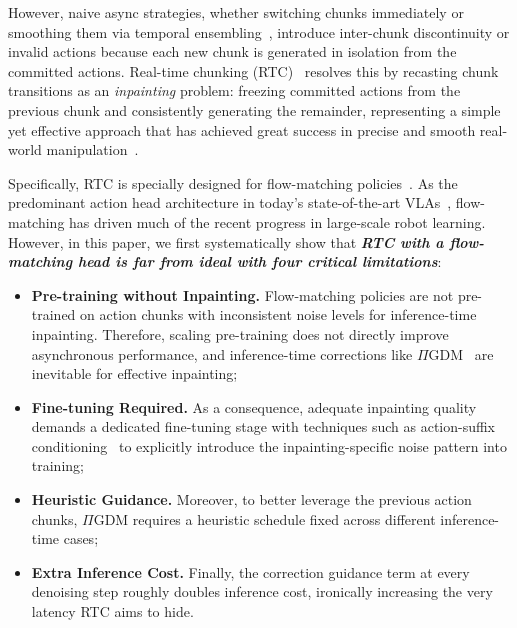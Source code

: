 \documentclass{article}
\begin{document}
However, naive async strategies, whether switching chunks immediately or smoothing them via temporal ensembling~\citep{zhao2023learning}, introduce inter-chunk discontinuity or invalid actions because each new chunk is generated in isolation from the committed actions.
Real-time chunking (RTC)~\citep{black2025real} resolves this by recasting chunk transitions as an \emph{inpainting} problem: freezing committed actions from the previous chunk and consistently generating the remainder, representing a simple yet effective approach that has achieved great success in precise and smooth real-world manipulation~\citep{intelligence2025pi_06, intelligence2026pi}.

Specifically, RTC is specially designed for flow-matching policies~\citep{lipman2022flow}.
As the predominant action head architecture in today's state-of-the-art VLAs~\citep{black2024pi_0, intelligence2025pi_, bjorck2025gr00t}, flow-matching has driven much of the recent progress in large-scale robot learning.
However, in this paper, we first systematically show that \emph{\textbf{RTC with a flow-matching head is far from ideal with four critical limitations}}:


\begin{itemize}
    \item [(a)] \textbf{Pre-training without Inpainting.} Flow-matching policies are not pre-trained on action chunks with inconsistent noise levels for inference-time inpainting.
    Therefore, scaling pre-training does not directly improve asynchronous performance, and inference-time corrections like $\Pi$GDM~\citep{song2023pseudoinverse} are inevitable for effective inpainting;
    \item [(b)] \textbf{Fine-tuning Required.} As a consequence, adequate inpainting quality demands a dedicated fine-tuning stage with techniques such as action-suffix conditioning~\citep{black2025training, wang2026real} to explicitly introduce the inpainting-specific noise pattern into training;
    \item [(c)] \textbf{Heuristic Guidance.} Moreover, to better leverage the previous action chunks, $\Pi$GDM requires a heuristic schedule fixed across different inference-time cases;
    \item [(d)] \textbf{Extra Inference Cost.} Finally, the correction guidance term at every denoising step roughly doubles inference cost, ironically increasing the very latency RTC aims to hide.
\end{itemize}
\end{document}
